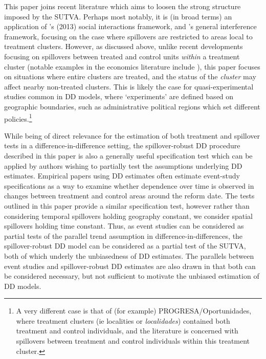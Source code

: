 \documentclass[12pt]{article}
\begin{document}
\begin{spacing}{1.3}
This paper joins recent literature which aims to loosen the strong structure 
imposed by the SUTVA.  Perhaps most notably, it is (in broad terms) an 
application of \citeauthor{Manski2013}'s (2013) social interactions framework, 
and \citet{AronowSamii2017}'s general interference framework, focusing on the
case where spillovers are restricted to areas local to treatment clusters.
However, as discussed above, unlike recent developments focusing on spillovers 
between treated and control units \emph{within} a treatment cluster (notable
examples in the economics literature include \citet{McIntosh2008,Bairdetal2014,
  AngelucciDeGiorgi2009,AngelucciDiMaro2010}), this paper focuses on situations where entire clusters
are treated, and the status of the \emph{cluster} may affect nearby non-treated
clusters.  This is likely the case for quasi-experimental studies common in DD
models, where `experiments' are defined based on geographic boundaries, such as
administrative political regions which set different policies.\footnote{A very
  different case is that of (for example) PROGRESA/Oportunidades, where treatment
  clusters (ie localities or \emph{localidades}) contained both treatment and
  control individuals, and the literature is concerned with spillovers between
  treatment and control individuals within this treatment cluster.}

While being of direct relevance for the estimation of both treatment and
spillover tests in a difference-in-difference setting, the spillover-robust
DD procedure described in this paper is also a generally useful specification
test which can be applied by authors wishing to partially test the assumptions
underlying DD estimates.  Empirical papers using DD estimates often estimate
event-study specifications as a way to examine whether dependence over time
is observed in changes between treatment and control areas around the reform
date.  The tests outlined in this paper provide a similar specification test,
however rather than considering temporal spillovers holding geography constant,
we consider spatial spillovers holding time constant.  Thus, as event studies
can be considered as partial tests of the parallel trend assumption in
difference-in-differences, the spillover-robust DD model can be considered as a
partial test of the SUTVA, both of which underly the unbiasedness of DD
estimates. The parallels between event studies and spillover-robust DD estimates
are also drawn in that both can be considered necessary, but not sufficient to
motivate the unbiased estimation of DD models.



\end{spacing}
\end{document}
